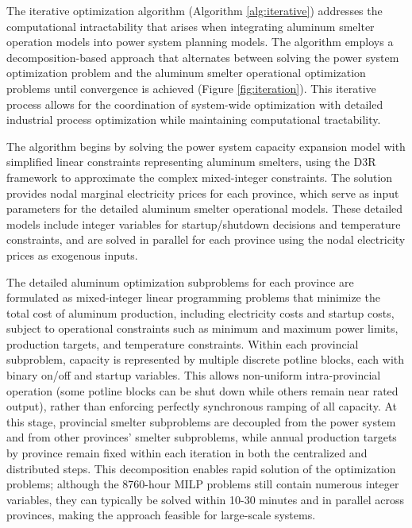 \documentclass[preprint,12pt]{elsarticle}
\begin{document}
The iterative optimization algorithm (Algorithm \ref{alg:iterative}) addresses the computational intractability that arises when integrating aluminum smelter operation models into power system planning models. The algorithm employs a decomposition-based approach that alternates between solving the power system optimization problem and the aluminum smelter operational optimization problems until convergence is achieved (Figure \ref{fig:iteration}). This iterative process allows for the coordination of system-wide optimization with detailed industrial process optimization while maintaining computational tractability.

The algorithm begins by solving the power system capacity expansion model with simplified linear constraints representing aluminum smelters, using the D3R framework to approximate the complex mixed-integer constraints. The solution provides nodal marginal electricity prices for each province, which serve as input parameters for the detailed aluminum smelter operational models. These detailed models include integer variables for startup/shutdown decisions and temperature constraints, and are solved in parallel for each province using the nodal electricity prices as exogenous inputs.

The detailed aluminum optimization subproblems for each province are formulated as mixed-integer linear programming problems that minimize the total cost of aluminum production, including electricity costs and startup costs, subject to operational constraints such as minimum and maximum power limits, production targets, and temperature constraints. Within each provincial subproblem, capacity is represented by multiple discrete potline blocks, each with binary on/off and startup variables. This allows non-uniform intra-provincial operation (some potline blocks can be shut down while others remain near rated output), rather than enforcing perfectly synchronous ramping of all capacity. At this stage, provincial smelter subproblems are decoupled from the power system and from other provinces' smelter subproblems, while annual production targets by province remain fixed within each iteration in both the centralized and distributed steps. This decomposition enables rapid solution of the optimization problems; although the 8760-hour MILP problems still contain numerous integer variables, they can typically be solved within 10-30 minutes and in parallel across provinces, making the approach feasible for large-scale systems.
\end{document}
